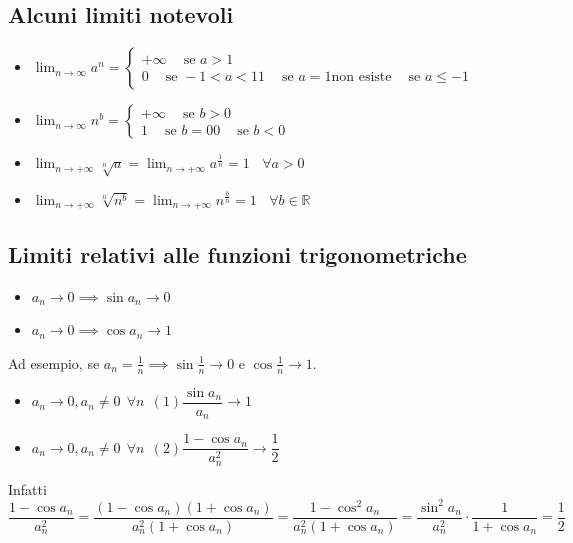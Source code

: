 \documentclass{article}
\newcommand{\R}{\mathbb{R}}
\begin{document}
\subsection{Alcuni limiti notevoli}
\begin{itemize}
    \item $\lim_{n\to\infty}a^n = \begin{cases}
                  +\infty \ \ \ \ \text{ se } a > 1 \\
                  0 \ \ \ \ \text{ se } -1 < a < 1
                  1 \ \ \ \ \text{ se } a = 1
                  \text{non esiste} \ \ \ \ \text{ se } a \leq -1
              \end{cases}$
    \item $\lim_{n\to\infty}n^b = \begin{cases}
                  +\infty \ \ \ \ \text{ se } b > 0 \\
                  1 \ \ \ \ \text{ se } b = 0
                  0 \ \ \ \ \text{ se } b < 0
              \end{cases}$
    \item $\lim_{n\to+\infty}\sqrt[n]{a} = \lim_{n\to+\infty}a^{\frac{1}{n}} = 1 \ \ \ \ \forall a > 0$
    \item $\lim_{n\to+\infty}\sqrt[n]{n^b} = \lim_{n\to+\infty}n^{\frac{b}{n}} = 1 \ \ \ \ \forall b \in \R$
\end{itemize}

\subsection{Limiti relativi alle funzioni trigonometriche}
\begin{itemize}
    \item $a_n\to0 \implies \sin a_n \to 0$
    \item $a_n\to0 \implies \cos a_n \to 1$
\end{itemize}
Ad esempio, se $a_n = \frac{1}{n} \implies \sin\frac{1}{n} \to 0$ e $\cos\frac{1}{n} \to 1$.
\begin{itemize}
    \item $a_n\to0, a_n\ne0 \ \ \forall n \ \ (1) \dfrac{\sin a_n}{a_n} \to 1$
    \item $a_n\to0, a_n\ne0 \ \ \forall n \ \ (2) \dfrac{1-\cos a_n}{a_n^2} \to \dfrac{1}{2}$
\end{itemize}
Infatti $\dfrac{1-\cos a_n}{a_n^2} = \dfrac{(1-\cos a_n)(1+\cos a_n)}{a_n^2(1+\cos a_n)} = \dfrac{1-\cos^2 a_n}{a_n^2(1+\cos a_n)} = \dfrac{\sin^2 a_n}{a_n^2}\cdot \dfrac{1}{1+\cos a_n} = \dfrac{1}{2}$
\end{document}
